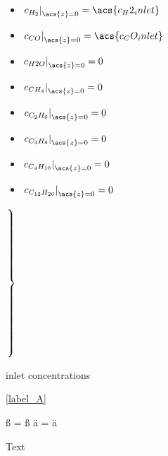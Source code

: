 \begin{minipage}{\dimexpr.5\linewidth-1em\relax}
  \begin{itemize}
	\item $\left.c_{H_2}\right|_{\acs{z}=0}=\acs{c_H2_inlet}$
	\item $\left.c_{CO}\right|_{\acs{z}=0}=\acs{c_CO_inlet}$
	\item $\left.c_{H2O}\right|_{\acs{z}=0}=0$
	\item $\left.c_{CH_4}\right|_{\acs{z}=0}=0$
	\item $\left.c_{C_2H_6}\right|_{\acs{z}=0}=0$
	\item $\left.c_{C_3H_8}\right|_{\acs{z}=0}=0$
	\item $\left.c_{C_4H_{10}}\right|_{\acs{z}=0}=0$
	\item $\left.c_{C_{12}H_{26}}\right|_{\acs{z}=0}=0$
\end{itemize}
\end{minipage}
\begin{minipage}[0pt]{1em}
  $\left.\mbox{\rule{0pt}{6.5\baselineskip}}\right\}$
\end{minipage}
\begin{minipage}{\dimexpr.5\linewidth-1em\relax}
inlet concentrations
\end{minipage}


\label{label_A}
\ref{label_A}
\cite{author}

ß = {\ss}
ä = \"{a}



\begin{appendix} Text \end{appendix}  %


\usepackage[firstpage]{draftwatermark} %


\usepackage{paralist}  %





\documentclass[preview,border=12pt,varwidth]{standalone}
\usepackage{tikz}    %
\usepackage{calc}    %
\def\checkmarkk{\tikz\fill[scale=0.4](0,.35) -- (.25,0) -- (1,.7) -- (.25,.15) -- cycle;}
\def\checkmark{\resizebox{\widthof{\checkmarkk}*\ratio{\widthof{x}}{\widthof{\normalsize x}}}{!}{\checkmarkk}}

